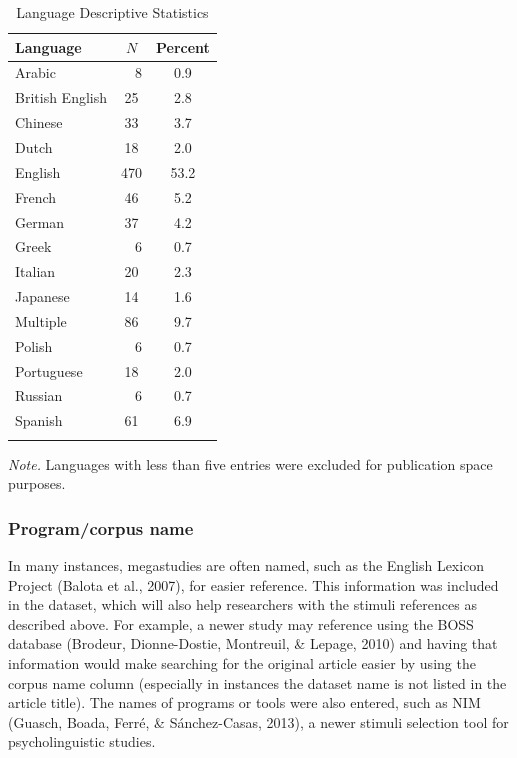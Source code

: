 \documentclass[english,,man]{apa6}
\theoremstyle{definition}
\theoremstyle{definition}
\theoremstyle{definition}
\theoremstyle{remark}
\begin{document}
\begin{table}[tbp]
\begin{center}
\begin{threeparttable}
\caption{\label{tab:lang-table}Language Descriptive Statistics}
\begin{tabular}{lcc}
\toprule
Language & $N$ & Percent\\
\midrule
Arabic & \ \ 8 & 0.9\\
British English & 25 & 2.8\\
Chinese & 33 & 3.7\\
Dutch & 18 & 2.0\\
English & 470 & 53.2\\
French & 46 & 5.2\\
German & 37 & 4.2\\
Greek & \ \ 6 & 0.7\\
Italian & 20 & 2.3\\
Japanese & 14 & 1.6\\
Multiple & 86 & 9.7\\
Polish & \ \ 6 & 0.7\\
Portuguese & 18 & 2.0\\
Russian & \ \ 6 & 0.7\\
Spanish & 61 & 6.9\\
\bottomrule
\addlinespace
\end{tabular}
\begin{tablenotes}[para]
\normalsize{\textit{Note.} Languages with less than five entries were excluded for publication space purposes.}
\end{tablenotes}
\end{threeparttable}
\end{center}
\end{table}

\hypertarget{programcorpus-name}{%
\subsubsection{Program/corpus name}\label{programcorpus-name}}

In many instances, megastudies are often named, such as the English
Lexicon Project (Balota et al., 2007), for easier reference. This
information was included in the dataset, which will also help
researchers with the stimuli references as described above. For example,
a newer study may reference using the BOSS database (Brodeur,
Dionne-Dostie, Montreuil, \& Lepage, 2010) and having that information
would make searching for the original article easier by using the corpus
name column (especially in instances the dataset name is not listed in
the article title). The names of programs or tools were also entered,
such as NIM (Guasch, Boada, Ferré, \& Sánchez-Casas, 2013), a newer
stimuli selection tool for psycholinguistic studies.
\end{document}
